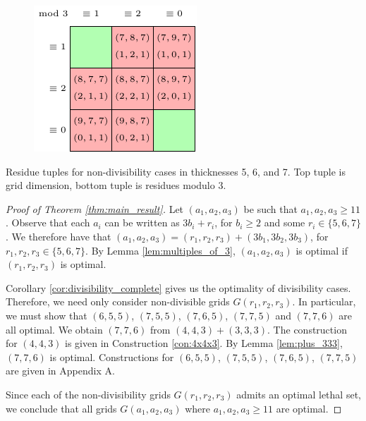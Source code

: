 \begin{table}[]
\begin{subfigure}{0.3\textwidth}
	\label{tab:r_b}
\end{subfigure} \hfill%
\begin{subfigure}{0.3\textwidth}
	\includegraphics[width=\textwidth]{tables/4/residue_1.pdf}
	\label{tab:r_c}
\end{subfigure}
\caption{Residue tuples for non-divisibility cases in thicknesses 5, 6, and 7. Top tuple is grid dimension, bottom tuple is residues modulo 3.}
\label{tab:residues}
\end{table} 

\begin{proof}[Proof of Theorem \ref{thm:main_result}]
Let $(a_1,a_2,a_3)$ be such that $a_1, a_2, a_3 \geq 11$. Observe that each $a_i$ can be written as $3b_i + r_i$, for $b_i \geq 2$ and some $r_i \in \{5,6,7\}$. We therefore have that $(a_1,a_2,a_3) = (r_1,r_2,r_3) + (3b_1,3b_2,3b_3)$, for $r_1,r_2,r_3 \in \{5,6,7\}$. By Lemma \ref{lem:multiples_of_3}, $(a_1,a_2,a_3)$ is optimal if $(r_1,r_2,r_3)$ is optimal. 

Corollary \ref{cor:divisibility_complete} gives us the optimality of divisibility cases. Therefore, we need only consider non-divisible grids $G(r_1,r_2,r_3)$. In particular, we must show that $(6,5,5)$, $(7,5,5)$, $(7,6,5)$, $(7,7,5)$ and $(7,7,6)$ are all optimal. We obtain $(7,7,6)$ from $(4,4,3) + (3,3,3)$. The construction for $(4,4,3)$ is given in Construction \ref{con:4x4x3}. By Lemma \ref{lem:plus_333}, $(7,7,6)$ is optimal. Constructions for $(6,5,5)$, $(7,5,5)$, $(7,6,5)$, $(7,7,5)$ are given in Appendix A.

Since each of the non-divisibility grids $G(r_1,r_2,r_3)$ admits an optimal lethal set, we conclude that all grids $G(a_1,a_2,a_3)$ where $a_1, a_2, a_3 \geq 11$ are optimal.
\end{proof}

